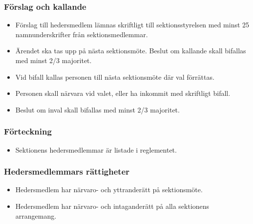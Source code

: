 \documentclass[11pt,a4paper]{article}
\begin{document}
\subsubsection{Förslag och kallande}
\begin{itemize}

  \item Förslag till hedersmedlem lämnas skriftligt till sektionsstyrelsen med
  minst 25 namnunderskrifter från sektionsmedlemmar.

  \item Ärendet ska tas upp på nästa sektionsmöte. Beslut om kallande
  skall bifallas med minst 2/3 majoritet.

  \item Vid bifall kallas personen till nästa sektionsmöte där val
  förrättas.

  \item Personen skall närvara vid valet, eller ha inkommit med
  skriftligt bifall.

  \item Beslut om inval skall bifallas med minst 2/3 majoritet.

\end{itemize}



\subsubsection{Förteckning}
\begin{itemize}

  \item Sektionens hedersmedlemmar är listade i reglementet.

\end{itemize}



\subsubsection{Hedersmedlemmars rättigheter}
\begin{itemize}

  \item Hedersmedlem har närvaro- och yttranderätt på sektionsmöte.

  \item Hedersmedlem har närvaro- och intaganderätt på alla sektionens
arrangemang.

\end{itemize}
\end{document}
